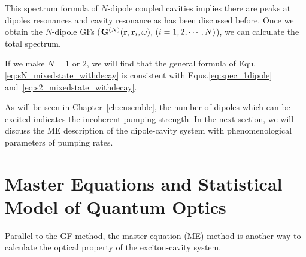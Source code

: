 This spectrum formula of $N$-dipole coupled cavities implies there are peaks at dipoles resonances and cavity resonance as has been discussed before. Once we obtain the $N$-dipole GFs ($\mathbf{G}^{(N)}(\mathbf{r},\mathbf{r}_i,\omega),\,(i=1,2,\cdots, N)$), we can calculate the total spectrum.

If we make $N=1$ or $2$, we will find that the general formula of Equ.\eqref{eq:sN_mixedstate_withdecay} is consistent with Equs.\eqref{eq:spec_1dipole} and~\eqref{eq:s2_mixedstate_withdecay}.

As will be seen in Chapter~\ref{ch:ensemble}, the number of dipoles which can be excited indicates the incoherent pumping strength. In the next section, we will discuss the ME description of the dipole-cavity system with phenomenological parameters of pumping rates.






\section{Master Equations and Statistical Model of Quantum Optics}
Parallel to the GF method, the master equation (ME) method is another way to calculate the optical property of the exciton-cavity system.

